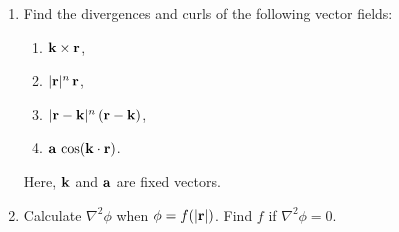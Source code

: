 {\begin{enumerate}
\item Find the divergences and curls of the following vector fields:
\begin{enumerate}
\item ${\bf k}\times {\bf r}$,
\item $|{\bf r}|^n\,{\bf r}$,
\item $|{\bf r} - {\bf k}|^{n}\,({\bf r}-{\bf k})$,
\item ${\bf a}\,\cos({\bf k}\cdot {\bf r})$.
\end{enumerate}
Here, ${\bf k}$ and ${\bf a}$ are fixed vectors.

\item Calculate $\nabla^2\phi$ when  $\phi=f(|{\bf r} |)$. Find $f$
if $\nabla^2\phi=0$. 


\end{enumerate}
\renewcommand{\theenumi}{\arabic{enumi}}}
